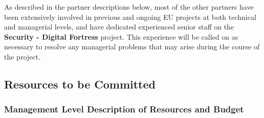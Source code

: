 \documentclass[a4paper,11pt]{article}
\newcommand{\project}[1]{\textbf{#1}\xspace}
\newcommand{\SECURITY}{\project{Security - Digital Fortress}}
\newcommand{\TheProject}{\SECURITY}
\begin{document}
As described in the partner descriptions below,
most of the other partners have been extensively involved in previous and
ongoing EU projects at both technical and managerial
levels, and have dedicated experienced senior staff on the \TheProject{} project.
%
This experience will be called on as necessary to resolve any
managerial problems that may arise during the course of the
project.


\subsection{Resources to be Committed}




\subsubsection{Management Level Description of Resources and Budget}
\vspace{-6pt}

\end{document}
